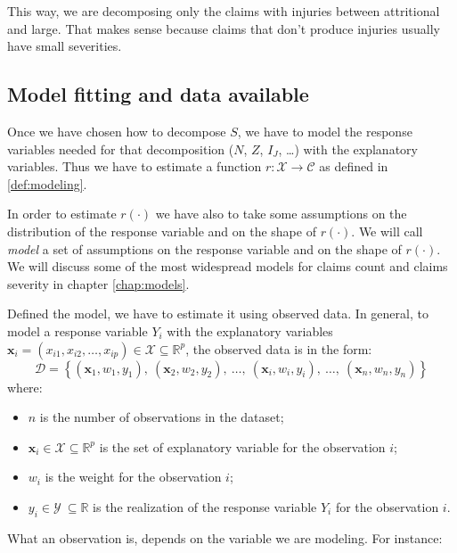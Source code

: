 \documentclass[a4paper, nobind]{templates/ociamthesis}
\providecommand{\tightlist}{%
  \setlength{\itemsep}{0pt}\setlength{\parskip}{0pt}}
\theoremstyle{definition}
\theoremstyle{definition}
\theoremstyle{definition}
\theoremstyle{remark}
\begin{document}
This way, we are decomposing only the claims with injuries between attritional and large. That makes sense because claims that don't produce injuries usually have small severities.

\hypertarget{chap:model-fitting-and-data-available}{%
\subsection{Model fitting and data available}\label{chap:model-fitting-and-data-available}}

Once we have chosen how to decompose \(S\), we have to model the response variables needed for that decomposition (\(N\), \(Z\), \(I_J\), \ldots) with the explanatory variables. Thus we have to estimate a function \(r:\mathcal{X}\rightarrow \mathcal{C}\) as defined in \ref{def:modeling}.

In order to estimate \(r(\cdot)\) we have also to take some assumptions on the distribution of the response variable and on the shape of \(r(\cdot)\). We will call \emph{model} a set of assumptions on the response variable and on the shape of \(r(\cdot)\). We will discuss some of the most widespread models for claims count and claims severity in chapter \ref{chap:models}.

Defined the model, we have to estimate it using observed data. In general, to model a response variable \(Y_i\) with the explanatory variables \(\boldsymbol{x}_i=(x_{i1}, x_{i2}, \dots, x_{ip})\in \mathcal{X} \subseteq \mathbb{R}^p\), the observed data is in the form:
\[
\mathcal{D} = \left\{(\boldsymbol{x}_1, w_1, y_1), \ (\boldsymbol{x}_2, w_2, y_2), \ \dots, \ (\boldsymbol{x}_i, w_i, y_i), \ \dots, \ (\boldsymbol{x}_n, w_n, y_n)\right\}
\]
where:

\begin{itemize}
\tightlist
\item
  \(n\) is the number of observations in the dataset;
\item
  \(\boldsymbol{x}_i\in \mathcal{X} \subseteq \mathbb{R}^p\) is the set of explanatory variable for the observation \(i\);
\item
  \(w_i\) is the weight for the observation \(i\);
\item
  \(y_i\in \mathcal{Y}\ \subseteq \mathbb{R}\) is the realization of the response variable \(Y_i\) for the observation \(i\).
\end{itemize}

What an observation is, depends on the variable we are modeling. For instance:
\end{document}
